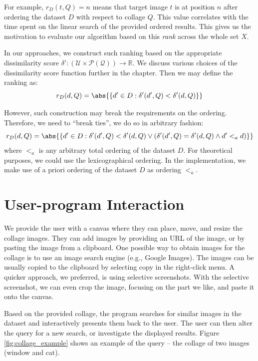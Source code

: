 For example, $r_D(t, Q) = n$ means that target image $t$ is at position $n$ after ordering the dataset $D$ with respect to collage $Q$. This value correlates with the time spent on the linear search of the provided ordered results. This gives us the motivation to evaluate our algorithm based on this \emph{rank} across the whole set $X$.

In our approaches, we construct such ranking based on the appropriate dissimilarity score $\delta': (\mathcal{U} \times \mathcal{P(Q)}) \rightarrow \mathbb{R}$. We discuss various choices of the dissimilarity score function further in the chapter. Then we may define the ranking as:
$$
    r_D(d, Q) = \abs{\{d' \in D : \delta'(d', Q) < \delta'(d, Q)\}}
$$


However, such construction may break the requirements on the ordering. Therefore, we need to ``break ties'', we do so in arbitrary fashion:
$$
    r_D(d, Q) = \abs{\left\{d' \in D : \delta'(d', Q) < \delta'(d, Q) \lor \left(\delta'(d', Q) = \delta'(d, Q) \land d' <_a d\right)\right\}}
$$
where $<_a$ is any arbitrary total ordering of the dataset $D$. For theoretical purposes, we could use the lexicographical ordering. In the implementation, we make use of a priori ordering of the dataset $D$ as ordering $<_a$.

\section{User-program Interaction}

We provide the user with a canvas where they can place, move, and resize the collage images. They can add images by providing an URL of the image, or by pasting the image from a clipboard. One possible way to obtain images for the collage is to use an image search engine (e.g., Google Images). The images can be usually copied to the clipboard by selecting copy in the right-click menu. A quicker approach, we preferred, is using selective screenshots. With the selective screenshot, we can even crop the image, focusing on the part we like, and paste it onto the canvas.

Based on the provided collage, the program searches for similar images in the dataset and interactively presents them back to the user. The user can then alter the query for a new search, or investigate the displayed results. Figure \ref{fig:collage_example} shows an example of the query -- the collage of two images (window and cat). 

